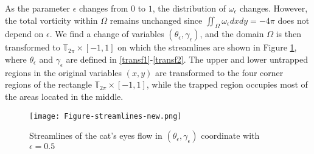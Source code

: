 \documentclass[1 [leqno, 11pt]{amsart}
\numberwithin{equation}{section}
\let\ep=\epsilon
\begin{document}
\begin{CJK*}{GBK}{song}
As the parameter $\ep$ changes from $0$ to $1$, the distribution of $\omega_\ep$ changes. However, the total vorticity within $\Omega$ remains unchanged since $\iint_\Omega \omega_\ep dxdy = -4\pi$ does not depend on $\epsilon$. We find a change of variables $(\theta_\ep,\gamma_\ep)$, and  the domain $\Omega$ is then transformed  to  $\mathbb{T}_{2\pi}\times [-1,1]$ on which the streamlines are shown in Figure \ref{fig:secondFig}, where $\theta_\ep$ and $\gamma_\ep$ are defined in \eqref{transf1}-\eqref{transf2}.  The upper and lower untrapped regions in the original variables $(x,y)$ are transformed to  the four corner regions of the rectangle $\mathbb{T}_{2\pi}\times [-1,1]$, while the trapped region occupies most of the areas located in the middle.


\begin{figure}[ht]
    \centering
	\texttt{[image: Figure-streamlines-new.png]}
	\caption{Streamlines of the cat's eyes flow in $(\theta_\ep,\gamma_\ep)$ coordinate with $\ep = 0.5$}
	\label{fig:secondFig}
\end{figure}
\fi







\end{CJK*}
\end{document}
